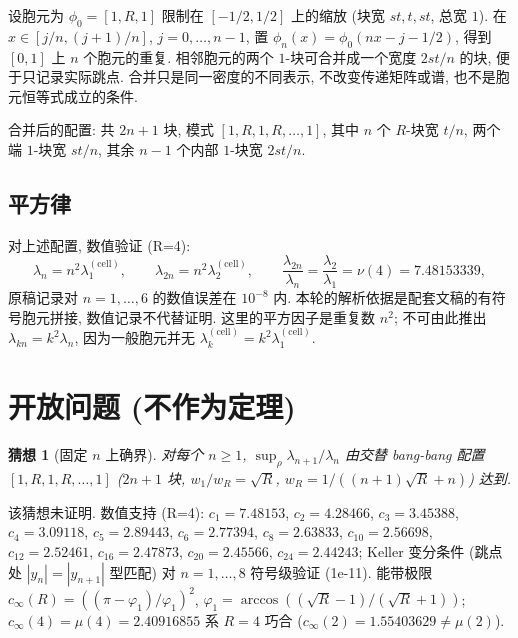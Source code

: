 \documentclass[UTF8]{ctexart}
\newtheorem{conjecture}[theorem]{猜想}
\begin{document}
设胞元为 $\phi_0 = [1, R, 1]$ 限制在 $[-1/2, 1/2]$ 上的缩放 (块宽 $st, t, st$,
总宽 $1$). 在 $x\in[j/n,(j+1)/n]$, $j=0,\ldots,n-1$, 置
$\phi_n(x)=\phi_0(nx-j-1/2)$, 得到 $[0,1]$ 上 $n$ 个胞元的重复.
相邻胞元的两个 $1$-块可合并成一个宽度 $2st/n$ 的块, 便于只记录实际跳点.
合并只是同一密度的不同表示, 不改变传递矩阵或谱, 也不是胞元恒等式成立的条件.

合并后的配置: 共 $2n+1$ 块, 模式 $[1, R, 1, R, \dots, 1]$,
其中 $n$ 个 $R$-块宽 $t/n$, 两个端 $1$-块宽 $st/n$, 其余 $n-1$ 个内部 $1$-块宽 $2st/n$.

\subsection{平方律}

对上述配置, 数值验证 (R=4):
\begin{equation}
	\lambda_n = n^2 \lambda_1^{(\text{cell})}, \qquad
	\lambda_{2n} = n^2 \lambda_2^{(\text{cell})}, \qquad
	\frac{\lambda_{2n}}{\lambda_n} = \frac{\lambda_2}{\lambda_1} = \nu(4) = 7.48153339,
\end{equation}
原稿记录对 $n=1,\ldots,6$ 的数值误差在 $10^{-8}$ 内.
本轮的解析依据是配套文稿的有符号胞元拼接, 数值记录不代替证明.
这里的平方因子是重复数 $n^2$; 不可由此推出 $\lambda_{kn}=k^2\lambda_n$,
因为一般胞元并无 $\lambda_k^{(\mathrm{cell})}=k^2\lambda_1^{(\mathrm{cell})}$.

\section{开放问题 (不作为定理)}\label{sec:open}

\begin{conjecture}[固定 $n$ 上确界]
对每个 $n \geq 1$, $\sup_{\rho} \lambda_{n+1}/\lambda_n$ 由交替 bang-bang 配置
$[1, R, 1, R, \dots, 1]$ ($2n+1$ 块, $w_1/w_R = \sqrt{R}$, $w_R = 1/((n+1)\sqrt{R}+n)$) 达到.
\end{conjecture}

该猜想未证明. 数值支持 (R=4): $c_1 = 7.48153$, $c_2 = 4.28466$, $c_3 = 3.45388$,
$c_4 = 3.09118$, $c_5 = 2.89443$, $c_6 = 2.77394$, $c_8 = 2.63833$, $c_{10} = 2.56698$,
$c_{12} = 2.52461$, $c_{16} = 2.47873$, $c_{20} = 2.45566$, $c_{24} = 2.44243$;
Keller 变分条件 (跳点处 $|y_n| = |y_{n+1}|$ 型匹配) 对 $n = 1,\dots,8$ 符号级验证 (1e-11).
能带极限 $c_{\infty}(R) = ((\pi-\varphi_1)/\varphi_1)^2$,
$\varphi_1 = \arccos((\sqrt{R}-1)/(\sqrt{R}+1))$; $c_{\infty}(4) = \mu(4) = 2.40916855$
系 $R = 4$ 巧合 ($c_{\infty}(2) = 1.55403629 \neq \mu(2)$).
\end{document}
